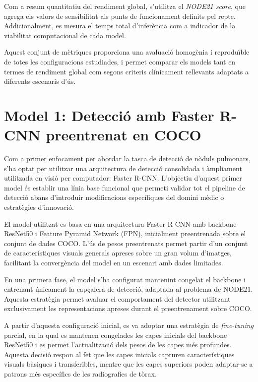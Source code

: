 \documentclass[conference]{IEEEtran}
\begin{document}
Com a resum quantitatiu del rendiment global, s’utilitza el \textit{NODE21 score},
que agrega els valors de sensibilitat als punts de funcionament definits pel
repte. Addicionalment, es mesura el temps total d’inferència com a indicador de
la viabilitat computacional de cada model.

Aquest conjunt de mètriques proporciona una avaluació homogènia i reproduïble
de totes les configuracions estudiades, i permet comparar els models tant en
termes de rendiment global com segons criteris clínicament rellevants adaptats
a diferents escenaris d’ús.



\section{Model 1: Detecció amb Faster R-CNN preentrenat en COCO}

Com a primer enfocament per abordar la tasca de detecció de nòduls pulmonars, s’ha
optat per utilitzar una arquitectura de detecció consolidada i àmpliament utilitzada
en visió per computador: Faster R-CNN. L’objectiu d’aquest primer model és establir
una línia base funcional que permeti validar tot el pipeline de detecció abans
d’introduir modificacions específiques del domini mèdic o estratègies d’innovació.

El model utilitzat es basa en una arquitectura Faster R-CNN amb backbone ResNet50 i
Feature Pyramid Network (FPN), inicialment preentrenada sobre el conjunt de dades
COCO. L’ús de pesos preentrenats permet partir d’un conjunt de característiques
visuals generals apreses sobre un gran volum d’imatges, facilitant la convergència
del model en un escenari amb dades limitades.

En una primera fase, el model s’ha configurat mantenint congelat el backbone i
entrenant únicament la capçalera de detecció, adaptada al problema de NODE21. Aquesta
estratègia permet avaluar el comportament del detector utilitzant exclusivament les
representacions apreses durant el preentrenament sobre COCO.

A partir d’aquesta configuració inicial, es va adoptar una estratègia de
\textit{fine-tuning} parcial, en la qual es mantenen congelades les capes inicials del
backbone ResNet50 i es permet l’actualització dels pesos de les capes més profundes.
Aquesta decisió respon al fet que les capes inicials capturen característiques visuals
bàsiques i transferibles, mentre que les capes superiors poden adaptar-se a patrons
més específics de les radiografies de tòrax.
\end{document}
